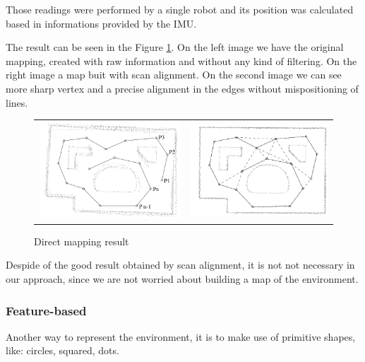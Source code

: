 Those readings were performed by a single robot and its position was calculated based in informations provided by the IMU.

The result can be seen in the Figure \ref{fig:mapping:direct:result}. On the left image we have the original mapping, created with raw information and without any kind of filtering. On the right image a map buit with scan alignment\cite{Lu:1997:GCR:591441.591464}. On the second image we can see more sharp vertex and a precise alignment in the edges without mispositioning of lines.

\begin{figure}[h]
\centering
	\begin{tabular}{lr}\\
		\includegraphics[width=0.5\columnwidth]{img/fig:mapping:direct:a} &
		\includegraphics[width=0.5\columnwidth]{img/fig:mapping:direct:b}
	\end{tabular}
	\caption{Direct mapping result}
	\label{fig:mapping:direct:result}
\end{figure}

Despide of the good result obtained by scan alignment, it is not not necessary in our approach, since we are not worried about building a map of the environment. 

\subsubsection{Feature-based}

Another way to represent the environment, it is to make use of primitive shapes, like: circles, squared, dots.

